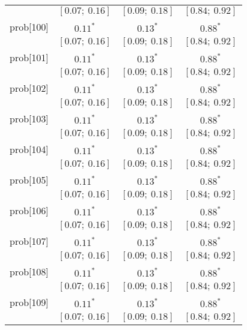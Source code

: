 \begin{table}
\begin{center}
\begin{tabular}{l c c c }
          & $[0.07;\ 0.16]$         & $[0.09;\ 0.18]$         & $[0.84;\ 0.92]$       \\
prob[100] & $0.11^{*}$              & $0.13^{*}$              & $0.88^{*}$            \\
          & $[0.07;\ 0.16]$         & $[0.09;\ 0.18]$         & $[0.84;\ 0.92]$       \\
prob[101] & $0.11^{*}$              & $0.13^{*}$              & $0.88^{*}$            \\
          & $[0.07;\ 0.16]$         & $[0.09;\ 0.18]$         & $[0.84;\ 0.92]$       \\
prob[102] & $0.11^{*}$              & $0.13^{*}$              & $0.88^{*}$            \\
          & $[0.07;\ 0.16]$         & $[0.09;\ 0.18]$         & $[0.84;\ 0.92]$       \\
prob[103] & $0.11^{*}$              & $0.13^{*}$              & $0.88^{*}$            \\
          & $[0.07;\ 0.16]$         & $[0.09;\ 0.18]$         & $[0.84;\ 0.92]$       \\
prob[104] & $0.11^{*}$              & $0.13^{*}$              & $0.88^{*}$            \\
          & $[0.07;\ 0.16]$         & $[0.09;\ 0.18]$         & $[0.84;\ 0.92]$       \\
prob[105] & $0.11^{*}$              & $0.13^{*}$              & $0.88^{*}$            \\
          & $[0.07;\ 0.16]$         & $[0.09;\ 0.18]$         & $[0.84;\ 0.92]$       \\
prob[106] & $0.11^{*}$              & $0.13^{*}$              & $0.88^{*}$            \\
          & $[0.07;\ 0.16]$         & $[0.09;\ 0.18]$         & $[0.84;\ 0.92]$       \\
prob[107] & $0.11^{*}$              & $0.13^{*}$              & $0.88^{*}$            \\
          & $[0.07;\ 0.16]$         & $[0.09;\ 0.18]$         & $[0.84;\ 0.92]$       \\
prob[108] & $0.11^{*}$              & $0.13^{*}$              & $0.88^{*}$            \\
          & $[0.07;\ 0.16]$         & $[0.09;\ 0.18]$         & $[0.84;\ 0.92]$       \\
prob[109] & $0.11^{*}$              & $0.13^{*}$              & $0.88^{*}$            \\
          & $[0.07;\ 0.16]$         & $[0.09;\ 0.18]$         & $[0.84;\ 0.92]$       \\

\end{tabular}
\end{center}
\end{table}
